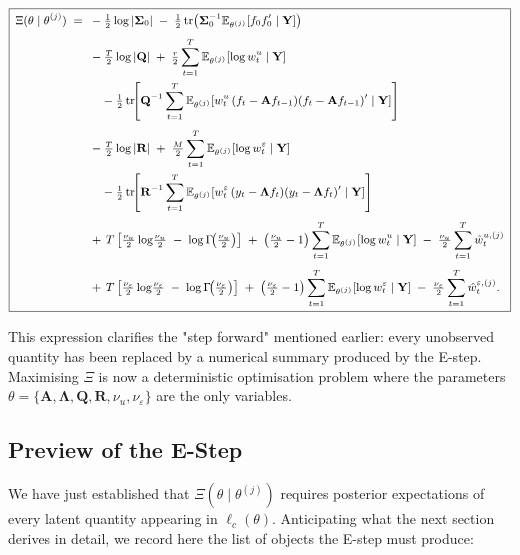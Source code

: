 \documentclass[11pt, a4paper, oneside]{article}
\newcommand{\mY}{\mathbf{Y}}
\newcommand{\mL}{\boldsymbol{\Lambda}}
\newcommand{\mA}{\mathbf{A}}
\newcommand{\mR}{\mathbf{R}}
\newcommand{\mQ}{\mathbf{Q}}
\begin{document}
\begin{equation}
\boxed{\,
\small %
\begin{aligned}
\Xi(\theta \mid \theta^{(j)}) \;=\;\;
&-\tfrac{1}{2}\log|\boldsymbol{\Sigma}_0| \;-\; \tfrac{1}{2}\,\mathrm{tr}\big(\boldsymbol{\Sigma}_0^{-1} \mathbb{E}_{\theta^{(j)}}[f_0 f_0' \mid \mY]\big) \\[3pt]
&-\tfrac{T}{2}\log|\mQ| \;+\; \tfrac{r}{2}\sum_{t=1}^{T} \mathbb{E}_{\theta^{(j)}}[\log w^u_t \mid \mY] \\
&\quad - \tfrac{1}{2}\,\mathrm{tr}\!\Bigg[\mQ^{-1}\sum_{t=1}^{T} \mathbb{E}_{\theta^{(j)}}[w^u_t\, (f_t - \mA f_{t-1})(f_t - \mA f_{t-1})' \mid \mY]\Bigg] \\[3pt]
&-\tfrac{T}{2}\log|\mR| \;+\; \tfrac{M}{2}\sum_{t=1}^{T} \mathbb{E}_{\theta^{(j)}}[\log w^\varepsilon_t \mid \mY] \\
&\quad - \tfrac{1}{2}\,\mathrm{tr}\!\Bigg[\mR^{-1}\sum_{t=1}^{T} \mathbb{E}_{\theta^{(j)}}[w^\varepsilon_t\, (y_t - \mL f_t)(y_t - \mL f_t)' \mid \mY]\Bigg] \\[3pt]
&+\, T \left[\tfrac{\nu_u}{2}\log\!\tfrac{\nu_u}{2} \;-\; \log \Gamma\!\big(\tfrac{\nu_u}{2}\big)\right]
\;+\; \big(\tfrac{\nu_u}{2} - 1\big)\sum_{t=1}^{T}\mathbb{E}_{\theta^{(j)}}[\log w^u_t \mid \mY]
\;-\; \tfrac{\nu_u}{2}\sum_{t=1}^{T} \hat{w}^{u,(j)}_t \\[3pt]
&+\, T \left[\tfrac{\nu_\varepsilon}{2}\log\!\tfrac{\nu_\varepsilon}{2} \;-\; \log \Gamma\!\big(\tfrac{\nu_\varepsilon}{2}\big)\right]
\;+\; \big(\tfrac{\nu_\varepsilon}{2} - 1\big)\sum_{t=1}^{T}\mathbb{E}_{\theta^{(j)}}[\log w^\varepsilon_t \mid \mY]
\;-\; \tfrac{\nu_\varepsilon}{2}\sum_{t=1}^{T} \hat{w}^{\varepsilon,(j)}_t.
\end{aligned}
\,}
\label{eq:Xi-expanded}
\end{equation}

This expression clarifies the "step forward" mentioned earlier: every unobserved quantity has been replaced by a numerical summary produced by the E-step. Maximising $\Xi$ is now a deterministic optimisation problem where the parameters $\theta = \{\mA, \mL, \mQ, \mR, \nu_u, \nu_\varepsilon\}$ are the only variables.

\subsection{Preview of the E-Step}

We have just established that $\Xi(\theta \mid \theta^{(j)})$ requires
posterior expectations of every latent quantity appearing in
$\ell_c(\theta)$. Anticipating what the next section derives in
detail, we record here the list of objects the E-step must produce:
\end{document}
